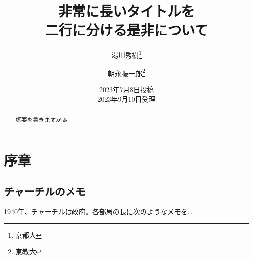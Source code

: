 \documentclass[titlepage]{jlreq}
\begin{document}
\title{非常に長いタイトルを \\ 二行に分ける是非について}
\author{湯川秀樹\thanks{京都大} \and 朝永振一郎\thanks{東教大}}
\date{2023年7月8日投稿 \\ 2023年9月10日受理}
\maketitle
\begin{abstract}
    概要を書きますかぁ
\end{abstract}
\section{序章}
\subsection{チャーチルのメモ}
 1940年、チャーチルは政府。各部局の長に次のようなメモを…
\end{document}
